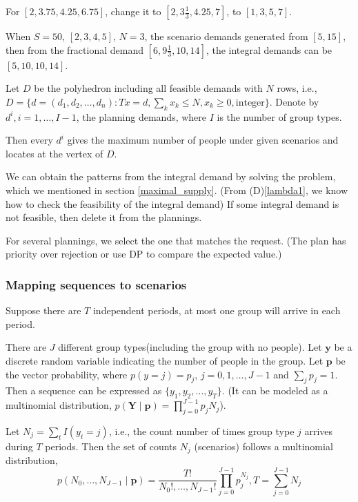 For $[2, 3.75, 4.25, 6.75]$, change it to $[2, 3\frac{1}{3}, 4.25, 7]$, to $[1, 3, 5, 7]$.

When $S = 50$, $[2,3,4,5]$, $N =3$, the scenario demands generated from $[5,15]$, then from the fractional demand $[6, 9\frac{1}{3}, 10, 14]$, the integral demands can be $[5, 10, 10, 14]$. 

Let $D$ be the polyhedron including all feasible demands with $N$ rows, i.e., $D = \{d = (d_1,d_2,\ldots, d_n): Tx = d,\sum_{k} x_k \leq N, x_k \geq 0, \mbox{integer} \}$.
Denote by $d^{i}, i = 1,\ldots, I-1$, the planning demands, where $I$ is the number of group types.

Then every $d^{i}$ gives the maximum number of people under given scenarios and locates at the vertex of $D$.


We can obtain the patterns from the integral demand by
solving the problem, which we mentioned in section \ref{maximal_supply}. (From (D)\ref{lambda1}, we know how to check the feasibility of the integral demand) If some integral demand is not feasible, then delete it from the plannings.

For several plannings, we select the one that matches the request. (The plan has priority over rejection or use DP to compare the expected value.) 

\subsubsection{Mapping sequences to scenarios}\label{MappingSeq}
Suppose there are $T$ independent periods, at most one group will arrive in each period.

There are $J$ different group types(including the group with no people). Let $\mathbf{y}$ be a discrete random variable indicating the number of people in the group. Let $\mathbf{p}$ be the vector probability, where $p(y = j) = p_j$, $j = 0,1,\ldots,J-1$ and $\sum_{j} p_{j} =1$. Then a sequence can be expressed as $\{y_{1}, y_{2}, \ldots, y_{T}\}$. (It can be modeled as a multinomial distribution, $p(\mathbf{Y} \mid \mathbf{p})=\prod_{j=0}^{J-1} p_j N_j$).

Let $N_{j} = \sum_{t} I(y_t = j)$, i.e., the count number of times group type $j$ arrives during $T$ periods. Then the set of counts $N_{j}$ (scenarios) follows a multinomial distribution, $$p\left(N_0, \ldots, N_{J-1} \mid \mathbf{p}\right)=\frac{T !}{N_{0}!, \ldots, N_{J-1}!} \prod_{j=0}^{J-1} p_{j}^{N_j}, T = \sum_{j=0}^{J-1} N_{j}$$

